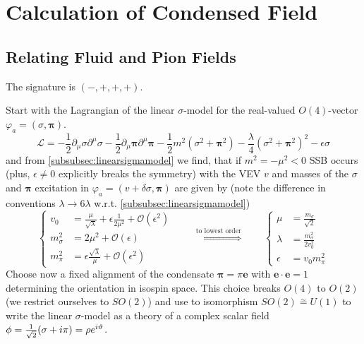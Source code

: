 \chapter{Calculation of Condensed Field}

\section{Relating Fluid and Pion Fields}

The signature is $(-,+,+,+)$.

Start with the Lagrangian of the linear $\sigma$-model for the real-valued $O(4)$-vector $\varphi_a=(\sigma,\mathbf{\pi})$.
\begin{equation}
    \mathscr{L}=-\frac{1}{2}\partial_\mu\sigma\partial^\mu\sigma-\frac{1}{2}\partial_\mu\mathbf{\pi}\partial^\mu\mathbf{\pi}-\frac{1}{2}m^2(\sigma^2+\mathbf{\pi}^2)-\frac{\lambda}{4}(\sigma^2+\mathbf{\pi}^2)^2-\epsilon\sigma
    \label{eq:Lagrangian_LinearSigma1}
\end{equation}
and from \ref{subsubsec:linearsigmamodel} we find, that if $m^2=-\mu^2<0$ SSB occurs (plus, $\epsilon\neq 0$ explicitly breaks the symmetry) with the VEV $v$ and masses of the $\sigma$ and $\mathbf{\pi}$ excitation in $\varphi_a=(v+\delta\sigma,\mathbf{\pi})$ are given by (note the difference in conventions $\lambda\to 6\lambda$ w.r.t. \ref{subsubsec:linearsigmamodel})
\begin{equation}
    \left\{
    \begin{split}
        v_0         & =\frac{\mu}{\sqrt{\lambda}}+\epsilon\frac{1}{2\mu^2}+\mathcal{O}(\epsilon^2) \\
        m_\sigma^2 & =2\mu^2+\mathcal{O}(\epsilon)                                                \\
        m_\pi^2    & =\epsilon\frac{\sqrt{\lambda}}{\mu}+\mathcal{O}(\epsilon^2)
    \end{split}
    \right.\qquad\overset{\text{to lowest order}}{\iff}\qquad
    \left\{
    \begin{split}
        \mu&=\frac{m_\sigma}{\sqrt{2}}\\
        \lambda&=\frac{m_\sigma^2}{2v_0^2}\\
        \epsilon&=v_0m_\pi^2
    \end{split}
    \right.
    \label{eq:LinearSigmaModel_CouplingsMassesRelation}
\end{equation}
Choose now a fixed alignment of the condensate $\mathbf{\pi}=\pi\mathbf{e}$ with $\mathbf{e}\cdot\mathbf{e}=1$ determining the orientation in isospin space. This choice breaks $O(4)$ to $O(2)$ (we restrict ourselves to $SO(2)$) and use to isomorphism $SO(2)\overset{\sim}{=}U(1)$ to write the linear $\sigma$-model as a theory of a complex scalar field $\phi=\frac{1}{\sqrt{2}}(\sigma+{i}\pi)=\rho e^{{i}\vartheta}$.
